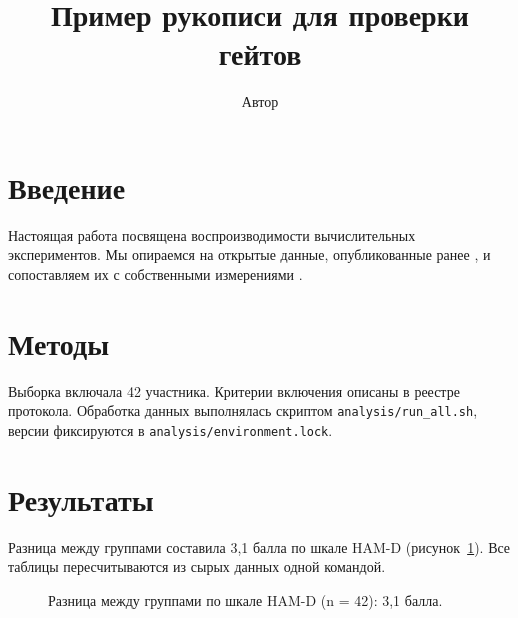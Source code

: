 \documentclass{article}
\title{Пример рукописи для проверки гейтов}
\author{Автор}
\begin{document}
\maketitle

\section{Введение}
Настоящая работа посвящена воспроизводимости вычислительных экспериментов.
Мы опираемся на открытые данные, опубликованные ранее \cite{smith2020},
и сопоставляем их с собственными измерениями \cite{ivanov2024}.

\section{Методы}
Выборка включала 42 участника. Критерии включения описаны в реестре протокола.
Обработка данных выполнялась скриптом \texttt{analysis/run\_all.sh}, версии
фиксируются в \texttt{analysis/environment.lock}.

\section{Результаты}
Разница между группами составила 3,1 балла по шкале HAM-D
(рисунок~\ref{fig:effect}). Все таблицы пересчитываются из сырых данных одной командой.

\begin{figure}[htbp]
  \centering
  \caption{Разница между группами по шкале HAM-D (n = 42): 3,1 балла.}
  \label{fig:effect}
\end{figure}



\end{document}

